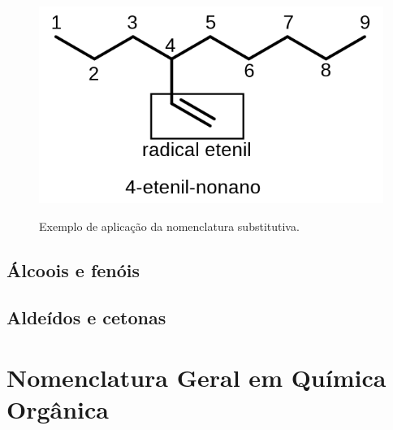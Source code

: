 \documentclass[a4paper,12pt]{book}
\begin{document}
\begin{figure}[h]
	\centering
	\caption{Exemplo de aplicação da nomenclatura substitutiva.}
	\vspace{0.5cm}
	\includegraphics[width=0.6\linewidth]{imagens/nomeetenil.png}
\label{fig:nomeetenil}
\end{figure}

\chapter{Álcoois e fenóis}


\chapter{Aldeídos e cetonas}


\part{Nomenclatura Geral em Química Orgânica}


\backmatter
\printbibliography[
heading=bibintoc,
title={Bibliografia Completa}
]
\end{document}
